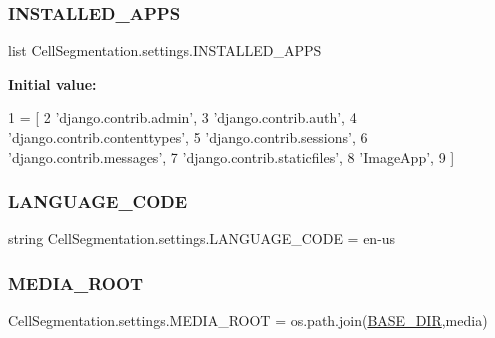\subsubsection{\texorpdfstring{I\+N\+S\+T\+A\+L\+L\+E\+D\+\_\+\+A\+P\+PS}{INSTALLED\_APPS}}
{\footnotesize\ttfamily list Cell\+Segmentation.\+settings.\+I\+N\+S\+T\+A\+L\+L\+E\+D\+\_\+\+A\+P\+PS}

{\bfseries Initial value\+:}
\begin{DoxyCode}
1 =  [
2     \textcolor{stringliteral}{'django.contrib.admin'},
3     \textcolor{stringliteral}{'django.contrib.auth'},
4     \textcolor{stringliteral}{'django.contrib.contenttypes'},
5     \textcolor{stringliteral}{'django.contrib.sessions'},
6     \textcolor{stringliteral}{'django.contrib.messages'},
7     \textcolor{stringliteral}{'django.contrib.staticfiles'},
8     \textcolor{stringliteral}{'ImageApp'},
9 ]
\end{DoxyCode}
\mbox{\label{namespace_cell_segmentation_1_1settings_ac73bad9ef24ef696f2df260657a0e61c}} 
\subsubsection{\texorpdfstring{L\+A\+N\+G\+U\+A\+G\+E\+\_\+\+C\+O\+DE}{LANGUAGE\_CODE}}
{\footnotesize\ttfamily string Cell\+Segmentation.\+settings.\+L\+A\+N\+G\+U\+A\+G\+E\+\_\+\+C\+O\+DE = \textquotesingle{}en-\/us\textquotesingle{}}

\mbox{\label{namespace_cell_segmentation_1_1settings_a533430f4561df8251c4e9f96b6cf3d56}} 
\subsubsection{\texorpdfstring{M\+E\+D\+I\+A\+\_\+\+R\+O\+OT}{MEDIA\_ROOT}}
{\footnotesize\ttfamily Cell\+Segmentation.\+settings.\+M\+E\+D\+I\+A\+\_\+\+R\+O\+OT = os.\+path.\+join(\mbox{\hyperlink{namespace_cell_segmentation_1_1settings_a354c3e9bde5b55650a0e821028acf8c2}{B\+A\+S\+E\+\_\+\+D\+IR}},\textquotesingle{}media\textquotesingle{})}

